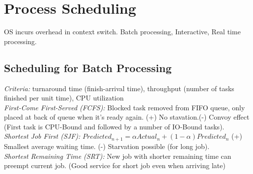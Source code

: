 \section{Process Scheduling}
OS incurs overhead in context switch. Batch processing, Interactive, Real time processing.

\subsection*{Scheduling for Batch Processing}
\emph{Criteria:} turnaround time (finish-arrival time), throughput (number of tasks finished per unit time), CPU utilization\\
\emph{First-Come First-Served (FCFS):} Blocked task removed from FIFO queue, only placed at back of queue when it's ready again. (+) No stavation.(-) Convoy effect (First task is CPU-Bound and followed by a number of IO-Bound tasks).\\
\emph{Shortest Job First (SJF):} $Predicted_{n+1}=\alpha Actual_n + (1-\alpha)Predicted_n$ (+) Smallest average waiting time. (-) Starvation possible (for long job).\\
\emph{Shortest Remaining Time (SRT):} New job with shorter remaining time can preempt current job. (Good service for short job even when arriving late)

